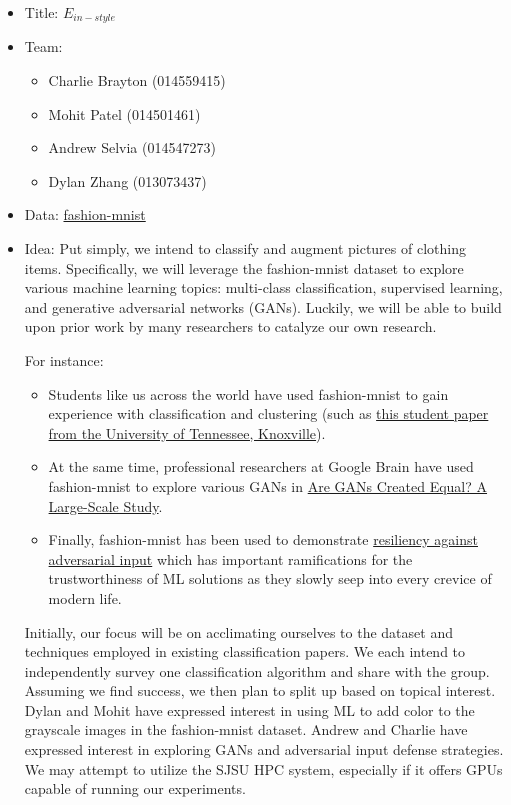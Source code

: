\documentclass[11pt]{article}
\begin{document}
    \begin{itemize}
        \item Title: \(E_{in-style}\)
        \item Team:
        \begin{itemize}
            \item Charlie Brayton (014559415)
            \item Mohit Patel (014501461)
            \item Andrew Selvia (014547273)
            \item Dylan Zhang (013073437)
        \end{itemize}
        \item Data: \href{https://github.com/zalandoresearch/fashion-mnist\#get-the-data}{fashion-mnist}
        \item Idea:
        Put simply, we intend to classify and augment pictures of clothing items.
        Specifically, we will leverage the fashion-mnist dataset to explore various machine learning topics: multi-class classification, supervised learning, and generative adversarial networks (GANs).
        Luckily, we will be able to build upon prior work by many researchers to catalyze our own research.

        For instance:
        \begin{itemize}
            \item Students like us across the world have used fashion-mnist to gain experience with classification and clustering (such as \href{https://cnedwards.com/files/Edwards_Yen_Final_Project.pdf}{this student paper from the University of Tennessee, Knoxville}).
            \item At the same time, professional researchers at Google Brain have used fashion-mnist to explore various GANs in \href{https://arxiv.org/abs/1711.10337}{Are GANs Created Equal? A Large-Scale Study}.
            \item Finally, fashion-mnist has been used to demonstrate \href{https://arxiv.org/pdf/1710.10766.pdf}{resiliency against adversarial input} which has important ramifications for the trustworthiness of ML solutions as they slowly seep into every crevice of modern life.
        \end{itemize}

        Initially, our focus will be on acclimating ourselves to the dataset and techniques employed in existing classification papers.
        We each intend to independently survey one classification algorithm and share with the group.
        Assuming we find success, we then plan to split up based on topical interest.
        Dylan and Mohit have expressed interest in using ML to add color to the grayscale images in the fashion-mnist dataset.
        Andrew and Charlie have expressed interest in exploring GANs and adversarial input defense strategies.
        We may attempt to utilize the SJSU HPC system, especially if it offers GPUs capable of running our experiments.
    \end{itemize}
\end{document}
